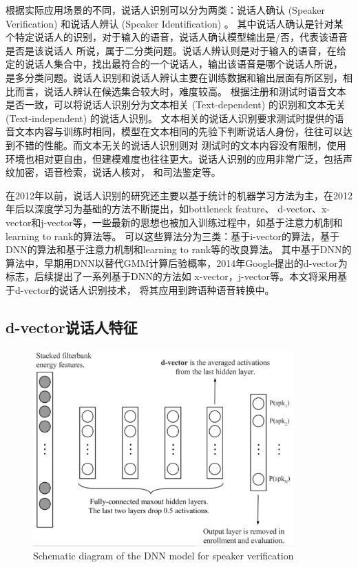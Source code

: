 根据实际应用场景的不同，说话人识别可以分为两类：说话人确认 (Speaker Verification) 和说话人辨认 (Speaker Identification) 。
其中说话人确认是针对某个特定说话人的识别，对于输入的语音，说话人确认模型输出是/否，代表该语音是否是该说话人
所说，属于二分类问题。说话人辨认则是对于输入的语音，在给定的说话人集合中，找出最符合的一个说话人，输出该语音是哪个说话人所说，
是多分类问题。说话人识别和说话人辨认主要在训练数据和输出层面有所区别，相比而言，说话人辨认在候选集合较大时，难度较高。
根据注册和测试时语音文本是否一致，可以将说话人识别分为文本相关 (Text-dependent) 的识别和文本无关 (Text-independent) 的说话人识别。
文本相关的说话人识别要求测试时提供的语音文本内容与训练时相同，模型在文本相同的先验下判断说话人身份，往往可以达到不错的性能。而文本无关的说话人识别则对
测试时的文本内容没有限制，使用环境也相对更自由，但建模难度也往往更大。说话人识别的应用非常广泛，包括声纹加密，语音检索，说话人核对，
和司法鉴定等。

在2012年以前，说话人识别的研究还主要以基于统计的机器学习方法为主，在2012年后以深度学习为基础的方法不断提出，如bottleneck feature、
d-vector、x-vector和j-vector等，一些最新的思想也被加入训练过程中，如基于注意力机制和learning to rank的算法等。
可以这些算法分为三类：基于i-vector的算法，基于DNN的算法和基于注意力机制和learning to rank等的改良算法。
其中基于DNN的算法中，早期用DNN以替代GMM计算后验概率，2014年Google提出的d-vector为标志\cite{variani2014deep}，后续提出了一系列基于DNN的方法如
x-vector，j-vector等\cite{snyder2016deep,chen2015multi,shi2017double}。本文将采用基于d-vector的说话人识别技术，
将其应用到跨语种语音转换中。

\subsection{d-vector说话人特征}

\begin{figure}[!htp]
    \centering
    \includegraphics[width=10cm,trim=0 10 0 0,clip]{figure/5_dvector.png}
    {Schematic diagram of the DNN model for speaker verification}
    \label{fig:dvector}
\end{figure}

